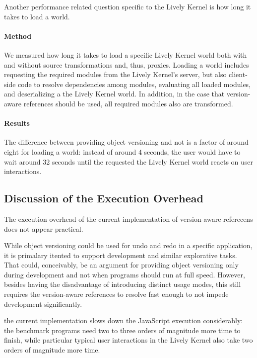 Another performance related question specific to the Lively Kernel is how long it takes to load a world.

\paragraph{Method}
We measured how long it takes to load a specific Lively Kernel world both with and without source transformations and, thus, proxies.
Loading a world includes requesting the required modules from the Lively Kernel's server, but also client-side code to resolve dependencies among modules, evaluating all loaded modules, and deserializing a the Lively Kernel world.
In addition, in the case that version-aware references should be used, all required modules also are transformed.

\paragraph{Results}
The difference between providing object versioning and not is a factor of around eight for loading a world: instead of around 4 seconds, the user would have to wait around 32 seconds until the requested the Lively Kernel world reacts on user interactions.




\subsection{Discussion of the Execution Overhead}

The execution overhead of the current implementation of version-aware referecens does not appear practical.



While object versioning could be used for undo and redo in a specific application, it is primalary itented to support development and similar explorative tasks.
That could, conceivably, be an argument for providing object versioning only during development and not when programs should run at full speed.
However, besides having the disadvantage of introducing distinct usage modes, this still requires the version-aware references to resolve fast enough to not impede development significantly.




the current implementation slows down the JavaScript execution considerably: the benchmark programs need two to three orders of magnitude more time to finish, while particular typical user interactions in the Lively Kernel also take two orders of magnitude more time.

